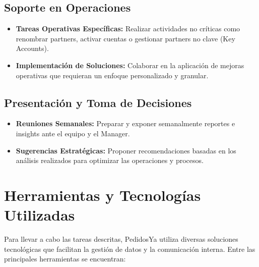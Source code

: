 \subsection{Soporte en Operaciones}
\begin{itemize}
  \item \textbf{Tareas Operativas Específicas:} Realizar actividades no críticas como renombrar partners, activar cuentas o gestionar partners no clave (Key Accounts).
  \item \textbf{Implementación de Soluciones:} Colaborar en la aplicación de mejoras operativas que requieran un enfoque personalizado y granular.
\end{itemize}

\subsection{Presentación y Toma de Decisiones}
\begin{itemize}
  \item \textbf{Reuniones Semanales:} Preparar y exponer semanalmente reportes e insights ante el equipo y el Manager.
  \item \textbf{Sugerencias Estratégicas:} Proponer recomendaciones basadas en los análisis realizados para optimizar las operaciones y procesos.
\end{itemize}

\section{Herramientas y Tecnologías Utilizadas \label{sec:sec3}}
Para llevar a cabo las tareas descritas, PedidosYa utiliza diversas soluciones tecnológicas que facilitan la gestión de datos y la comunicación interna. Entre las principales herramientas se encuentran:

